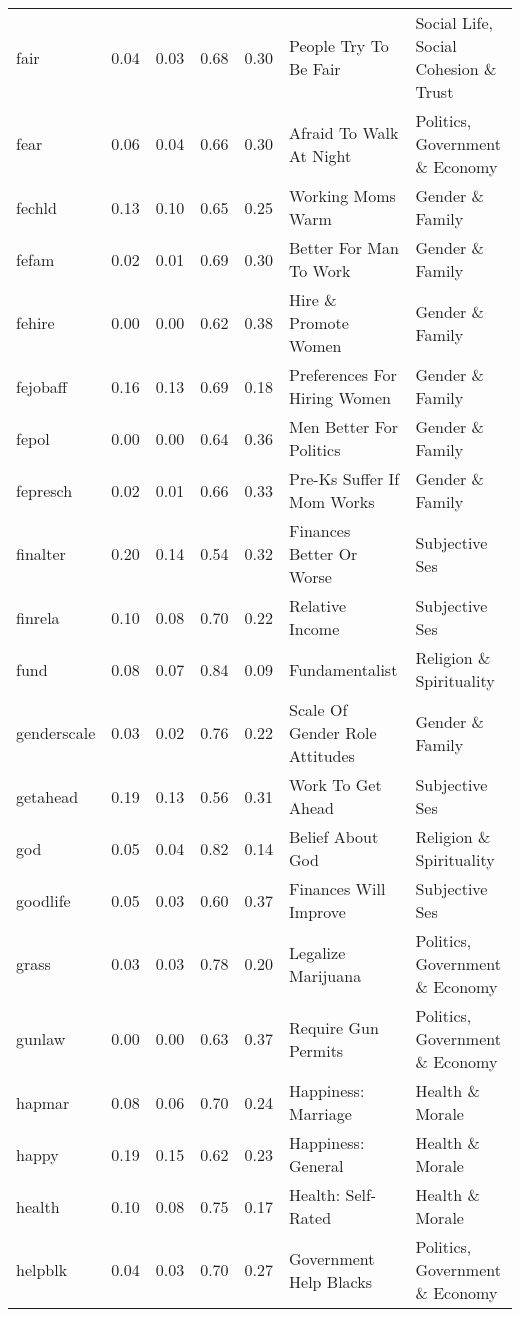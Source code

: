 \begin{longtable}{l|rrrrll}
fair & 0.04 & 0.03 & 0.68 & 0.30 & People Try To Be Fair & Social Life, Social Cohesion \& Trust \\ 
fear & 0.06 & 0.04 & 0.66 & 0.30 & Afraid To Walk At Night & Politics, Government \& Economy \\ 
fechld & 0.13 & 0.10 & 0.65 & 0.25 & Working Moms Warm & Gender \& Family \\ 
fefam & 0.02 & 0.01 & 0.69 & 0.30 & Better For Man To Work & Gender \& Family \\ 
fehire & 0.00 & 0.00 & 0.62 & 0.38 & Hire \& Promote Women & Gender \& Family \\ 
fejobaff & 0.16 & 0.13 & 0.69 & 0.18 & Preferences For Hiring Women & Gender \& Family \\ 
fepol & 0.00 & 0.00 & 0.64 & 0.36 & Men Better For Politics & Gender \& Family \\ 
fepresch & 0.02 & 0.01 & 0.66 & 0.33 & Pre-Ks Suffer If Mom Works & Gender \& Family \\ 
finalter & 0.20 & 0.14 & 0.54 & 0.32 & Finances Better Or Worse & Subjective Ses \\ 
finrela & 0.10 & 0.08 & 0.70 & 0.22 & Relative Income & Subjective Ses \\ 
fund & 0.08 & 0.07 & 0.84 & 0.09 & Fundamentalist & Religion \& Spirituality \\ 
genderscale & 0.03 & 0.02 & 0.76 & 0.22 & Scale Of Gender Role Attitudes & Gender \& Family \\ 
getahead & 0.19 & 0.13 & 0.56 & 0.31 & Work To Get Ahead & Subjective Ses \\ 
god & 0.05 & 0.04 & 0.82 & 0.14 & Belief About God & Religion \& Spirituality \\ 
goodlife & 0.05 & 0.03 & 0.60 & 0.37 & Finances Will Improve & Subjective Ses \\ 
grass & 0.03 & 0.03 & 0.78 & 0.20 & Legalize Marijuana & Politics, Government \& Economy \\ 
gunlaw & 0.00 & 0.00 & 0.63 & 0.37 & Require Gun Permits & Politics, Government \& Economy \\ 
hapmar & 0.08 & 0.06 & 0.70 & 0.24 & Happiness: Marriage & Health \& Morale \\ 
happy & 0.19 & 0.15 & 0.62 & 0.23 & Happiness: General & Health \& Morale \\ 
health & 0.10 & 0.08 & 0.75 & 0.17 & Health: Self-Rated & Health \& Morale \\ 
helpblk & 0.04 & 0.03 & 0.70 & 0.27 & Government Help Blacks & Politics, Government \& Economy \\ 

\end{longtable}
